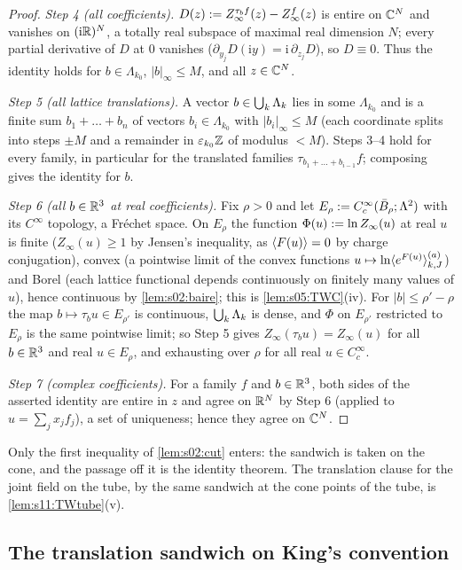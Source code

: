 \begin{proof}
\emph{Step 4 (all coefficients).} $D(z):= Z^{\tau_bf}_\infty(z)-Z^f_\infty(z)$ is entire on $\mathbb C^N$ and vanishes on $(\mathrm i\mathbb R)^N$, a totally real subspace of maximal real dimension $N$; every partial derivative of $D$ at $0$ vanishes ($\partial_{y_j}D(\mathrm iy)=\mathrm i\,\partial_{z_j}D$), so $D\equiv0$. Thus the identity holds for $b\in\Lambda_{k_0}$, $|b|_\infty\le M$, and all $z\in\mathbb C^N$.

\emph{Step 5 (all lattice translations).} A vector $b\in\bigcup_k\Lambda_k$ lies in some $\Lambda_{k_0}$ and is a finite sum $b_1+\dots+b_n$ of vectors $b_i\in\Lambda_{k_0}$ with $|b_i|_\infty\le M$ (each coordinate splits into steps $\pm M$ and a remainder in $\varepsilon_{k_0}\mathbb Z$ of modulus $<M$). Steps 3--4 hold for every family, in particular for the translated families $\tau_{b_1+\dots+b_{i-1}}f$; composing gives the identity for $b$.

\emph{Step 6 (all $b\in\mathbb R^3$ at real coefficients).} Fix $\rho>0$ and let $E_\rho:= C^\infty_c(\bar B_\rho;\Lambda^2)$ with its $C^\infty$ topology, a Fr\'echet space. On $E_\rho$ the function $\Phi(u):=\ln Z_\infty(u)$ at real $u$ is finite ($Z_\infty(u)\ge1$ by Jensen's inequality, as $\langle F(u)\rangle=0$ by charge conjugation), convex (a pointwise limit of the convex functions $u\mapsto\ln\langle e^{F(u)}\rangle^{(a)}_{k,J}$) and Borel (each lattice functional depends continuously on finitely many values of $u$), hence continuous by \cref{lem:s02:baire}; this is \cref{lem:s05:TWC}(iv). For $|b|\le\rho'-\rho$ the map $b\mapsto\tau_bu\in E_{\rho'}$ is continuous, $\bigcup_k\Lambda_k$ is dense, and $\Phi$ on $E_{\rho'}$ restricted to $E_\rho$ is the same pointwise limit; so Step 5 gives $Z_\infty(\tau_bu)=Z_\infty(u)$ for all $b\in\mathbb R^3$ and real $u\in E_\rho$, and exhausting over $\rho$ for all real $u\in C^\infty_c$.

\emph{Step 7 (complex coefficients).} For a family $f$ and $b\in\mathbb R^3$, both sides of the asserted identity are entire in $z$ and agree on $\mathbb R^N$ by Step 6 (applied to $u=\sum_jx_jf_j$), a set of uniqueness; hence they agree on $\mathbb C^N$.
\end{proof}

Only the first inequality of \cref{lem:s02:cut} enters: the sandwich is taken on the cone, and the passage off it is the identity theorem. The translation clause for the joint field on the tube, by the same sandwich at the cone points of the tube, is \cref{lem:s11:TWtube}(v).

\subsection{The translation sandwich on King's convention}

